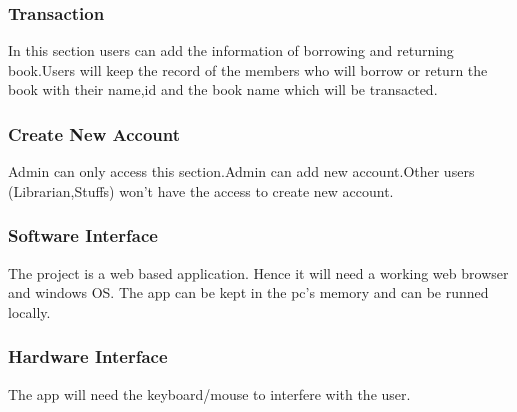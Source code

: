 \subsubsection{Transaction}
In this section users can add the information of borrowing and returning book.Users will keep the record of the members who will borrow or return the book with their name,id and the book name which will be transacted.

\subsubsection{Create New Account}
Admin can only access this section.Admin can add new account.Other users (Librarian,Stuffs) won't have the access to create new account.


\subsubsection{Software Interface}
The project is a web based application. Hence it will need a working web browser and windows OS. The app can be kept in the pc's memory and can be runned locally.

\subsubsection{Hardware Interface}
The app will need the keyboard/mouse to interfere with the user. 